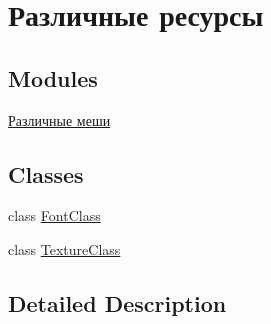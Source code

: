 \hypertarget{group___resources}{}\section{Различные ресурсы}
\label{group___resources}
\subsection*{Modules}
\begin{DoxyCompactItemize}
\item 
\hyperlink{group___meshes}{Различные меши}
\end{DoxyCompactItemize}
\subsection*{Classes}
\begin{DoxyCompactItemize}
\item 
class \hyperlink{class_font_class}{Font\+Class}
\item 
class \hyperlink{class_texture_class}{Texture\+Class}
\end{DoxyCompactItemize}


\subsection{Detailed Description}
